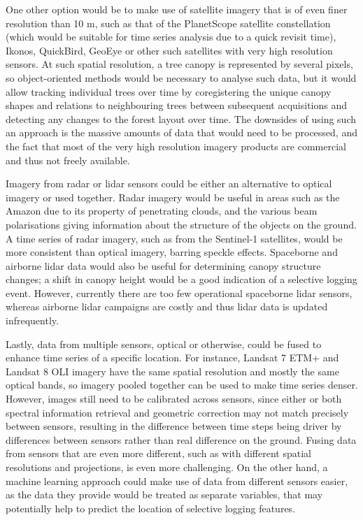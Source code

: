 \documentclass[a4paper,12pt]{scrbook}
\begin{document}
One other option would be to make use of satellite imagery that is of even finer resolution than 10 m, such as that of the PlanetScope satellite constellation (which would be suitable for time series analysis due to a quick revisit time), Ikonos, QuickBird, GeoEye or other such satellites with very high resolution sensors. At such spatial resolution, a tree canopy is represented by several pixels, so object-oriented methods would be necessary to analyse such data, but it would allow tracking individual trees over time by coregistering the unique canopy shapes and relations to neighbouring trees between subsequent acquisitions and detecting any changes to the forest layout over time. The downsides of using such an approach is the massive amounts of data that would need to be processed, and the fact that most of the very high resolution imagery products are commercial and thus not freely available.

Imagery from radar or lidar sensors could be either an alternative to optical imagery or used together. Radar imagery would be useful in areas such as the Amazon due to its property of penetrating clouds, and the various beam polarisations giving information about the structure of the objects on the ground. A time series of radar imagery, such as from the Sentinel-1 satellites, would be more consistent than optical imagery, barring speckle effects. Spaceborne and airborne lidar data would also be useful for determining canopy structure changes; a shift in canopy height would be a good indication of a selective logging event. However, currently there are too few operational spaceborne lidar sensors, whereas airborne lidar campaigns are costly and thus lidar data is updated infrequently.

Lastly, data from multiple sensors, optical or otherwise, could be fused to enhance time series of a specific location. For instance, Landsat 7 \ac{ETM+} and Landsat 8 \ac{OLI} imagery have the same spatial resolution and mostly the same optical bands, so imagery pooled together can be used to make time series denser. However, images still need to be calibrated across sensors, since either or both spectral information retrieval and geometric correction may not match precisely between sensors, resulting in the difference between time steps being driver by differences between sensors rather than real difference on the ground. Fusing data from sensors that are even more different, such as with different spatial resolutions and projections, is even more challenging. On the other hand, a machine learning approach could make use of data from different sensors easier, as the data they provide would be treated as separate variables, that may potentially help to predict the location of selective logging features.
\end{document}
